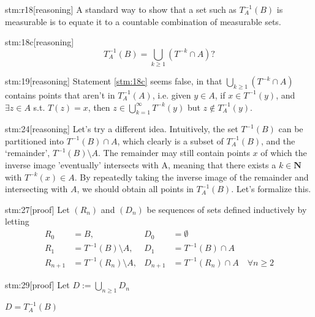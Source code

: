 \begin{stm}{stm:r18}[reasoning]
A standard way to show that a set such as $T_A^{-1}(B)$ is measurable is to equate it to a countable combination of measurable sets.
\end{stm}

\begin{stm}{stm:18c}[reasoning]
\[
T_A^{-1}(B) = \bigcup_{k \geq 1} (T^{-k} \cap A)?
\]
\end{stm}

\begin{stm}{stm:19}[reasoning]
Statement \ref{stm:18c} seems false, in that $\bigcup_{k \geq 1}(T^{-k} \cap A)$ contains points that aren't in $T_A^{-1}(A)$, i.e. given $y \in A$, if $x \in T^{-1}(y)$, and $\exists z \in A$ s.t. $T(z) = x$, then $z \in \bigcup_{k=1}^{\infty} T^{-k}(y)$ but $z \notin T_A^{-1}(y)$.
\end{stm}

\begin{stm}{stm:24}[reasoning]
Let's try a different idea. Intuitively, the set $T^{-1}(B)$ can be partitioned into $T^{-1}(B) \cap A$, which clearly is a subset of $T_A^{-1}(B)$, and the ‘remainder’, $T^{-1}(B) \setminus A$. The remainder may still contain points $x$ of which the inverse image 'eventually' intersects with A, meaning that there exists a $k \in \mathbf{N}$ with $T^{-k}(x) \in A$.  By repeatedly taking the inverse image of the remainder and intersecting with $A$, we should obtain all points in $T_A^{-1}(B)$. Let's formalize this.
\end{stm}

\begin{stm}{stm:27}[proof]
Let $(R_n)$ and $(D_n)$ be sequences of sets defined inductively by letting
\begin{align*}
R_0 &= B, & D_0 &= \emptyset \\
R_1 &= T^{-1}(B) \setminus A, & D_1 &= T^{-1}(B) \cap A \\
R_{n+1} &= T^{-1}(R_n) \setminus A, & D_{n+1} &= T^{-1}(R_n) \cap A \quad \forall n \ge 2
\end{align*}
\end{stm}

\begin{stm}{stm:29}[proof]
Let $D := \bigcup_{n \ge 1} D_n$
\end{stm}

\begin{conj}\label{conj:28}
$D = T_A^{-1}(B)$
\end{conj}

